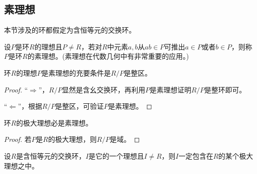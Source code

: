 \subsection{素理想}

本节涉及的环都假定为含恒等元的交换环。

\begin{definition}
	设$P$是环$R$的理想且$P\neq R$，若对$R$中元素$a,b$从$ab\in P$可推出$a\in P$或者$b\in P$，则称$P$是环$R$的素理想。(素理想在代数几何中有非常重要的应用。)
\end{definition}

\begin{theorem}
	环$R$的理想$P$是素理想的充要条件是$R/P$是整区。	
\end{theorem}
\begin{proof}
	“$\Rightarrow$”，$R/P$显然是含幺交换环，再利用$P$是素理想证明$R/P$是整环即可。
	\par
	“$\Leftarrow$”，根据$R/P$是整区，可验证$P$是素理想。
\end{proof}

\begin{corollary}
	环$R$的极大理想必是素理想。
\end{corollary}
\begin{proof}
	若$P$是$R$的极大理想，则$R/P$是域。
\end{proof}

\begin{theorem}
	设$R$是含恒等元的交换环，$I$是它的一个理想且$I\neq R$，则$I$一定包含在$R$的某个极大理想之中。
\end{theorem}